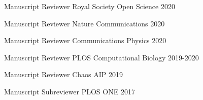 \vspace{3mm}
\begin{cvhonors}

\cvhonor
	{Manuscript Reviewer} %
	{Royal Society Open Science} %
	{} %
	{2020} %

\cvhonor
	{Manuscript Reviewer} %
	{Nature Communications} %
	{} %
	{2020} %


\cvhonor
	{Manuscript Reviewer} %
	{Communications Physics} %
	{} %
	{2020} %

\cvhonor
	{Manuscript Reviewer} %
	{PLOS Computational Biology} %
	{} %
	{2019-2020} %

\cvhonor
	{Manuscript Reviewer} %
	{Chaos AIP} %
	{} %
	{2019} %

\cvhonor
	{Manuscript Subreviewer} %
	{PLOS ONE} %
	{} %
	{2017} %

\end{cvhonors}

\vspace{3mm}


